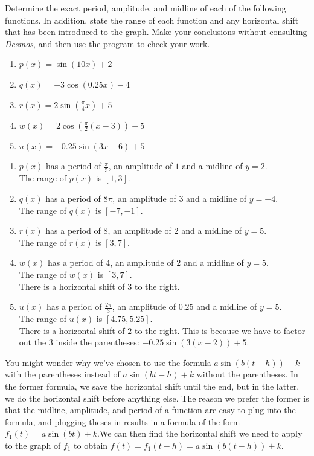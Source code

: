 \documentclass{ximera}
\begin{document}
\begin{example}
Determine the exact period, amplitude, and midline of each of the following functions.  In addition,  state the range of each function and any horizontal shift that has been introduced to the graph.  Make your conclusions without consulting \emph{Desmos}, and then use the program to check your work.%

\begin{enumerate}[label=\alph*.]
\item
\(p(x) = \sin(10x) + 2\)%
\item
\(q(x) = -3\cos(0.25x) - 4\)%
\item
\(r(x) = 2\sin\left( \frac{\pi}{4} x\right) + 5\)%
\item
\(w(x) = 2\cos\left( \frac{\pi}{2} (x-3) \right) + 5\)%
\item
\(u(x) = -0.25\sin\left(3x-6\right) + 5\)%
\end{enumerate}
\begin{explanation}
\begin{enumerate}[label=\alph*.]
\item
$p(x)$ has a period of $\frac{\pi}{5}$, an amplitude of $1$ and a midline of $y=2$. \\
The range of $p(x)$ is $[1,3]$.
\item
$q(x)$ has a period of $8\pi$, an amplitude of $3$ and a midline of $y=-4$. \\
The range of $q(x)$ is $[-7, -1]$.
\item
$r(x)$ has a period of $8$, an amplitude of $2$ and a midline of $y=5$. \\
 The range of $r(x)$ is $[3, 7]$.
\item
$w(x)$ has a period of $4$, an amplitude of $2$ and a midline of $y=5$.\\
The range of $w(x)$ is $[3, 7]$. \\
There is a horizontal shift of $3$ to the right.
\item
$u(x)$ has a period of $\frac{2\pi}{3}$, an amplitude of $0.25$ and a midline of $y=5$. \\
The range of $u(x)$ is $[4.75, 5.25]$. \\
There is a horizontal shift of $2$ to the right. This is because we have to factor out the 3 inside the parentheses: $-0.25\sin(3(x - 2)) + 5$. 
\end{enumerate}
\end{explanation}
\end{example}

You might wonder why we've chosen to use the formula $a\sin(b(t-h)) + k$ with the parentheses instead of $a\sin(bt - h) + k$ without the parentheses. In the former formula, we save the horizontal shift until the end, but in the latter, we do the horizontal shift before anything else. The reason we prefer the former is that the midline, amplitude, and period of a function are easy to plug into the formula, and plugging theses in results in a formula of the form $f_1(t) = a\sin(bt) + k$.We can then find the horizontal shift we need to apply to the graph of $f_1$ to obtain $f(t) = f_1(t - h) = a\sin(b(t - h)) + k$. 
\end{document}
